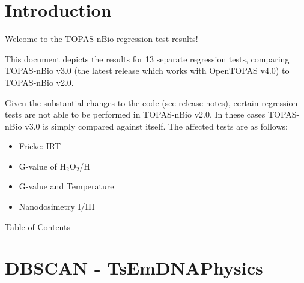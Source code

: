 \documentclass[aspectratio=1610]{beamer}
\title{\SUTname}
\subtitle{Regression testing (cf.\ \benchmarkname)}
\author{Jos\'e Ramos-M\'endez, Naoki D. Kondo, and Thongchai A.M. Masilela}
\institute{University of California San Francisco}
\date{\today}
\begin{document}
\frame{\titlepage}



\newpage

\section{Introduction}

\begin{frame}{\secname}

Welcome to the TOPAS-nBio regression test results!\vspace{5mm}

This document depicts the results for 13 separate regression tests, comparing TOPAS-nBio v3.0 (the latest release which works with OpenTOPAS v4.0) to TOPAS-nBio v2.0.\vspace{5mm}

Given the substantial changes to the code (see release notes), certain regression tests are not able to be performed in TOPAS-nBio v2.0. In these cases TOPAS-nBio v3.0 is simply compared against itself. The affected tests are as follows:\vspace{5mm}

\begin{itemize}
\item Fricke: IRT
\item G-value of H$_2$O$_2$/H
\item G-value and Temperature
\item Nanodosimetry I/III
\end{itemize}
\end{frame}

\begin{frame}[allowframebreaks]{Table of Contents}
\vspace{2mm}
  \tableofcontents[sections={1-12}]
    \framebreak
  \tableofcontents[sections={13-}]
\end{frame}

\section{DBSCAN - TsEmDNAPhysics}
\end{document}
